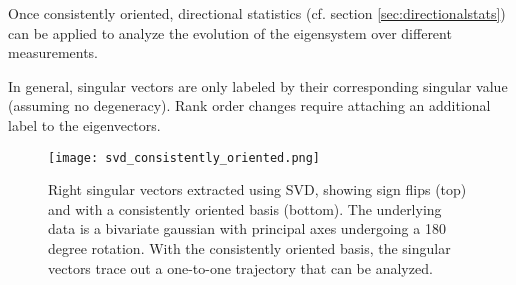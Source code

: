 Once consistently oriented, directional statistics (cf. section \ref{sec:directionalstats}) can be applied to analyze the evolution of the eigensystem over different measurements. 

In general, singular vectors are only labeled by their corresponding singular value (assuming no degeneracy). Rank order changes require attaching an additional label to the eigenvectors.

\begin{figure}
\centering
    \texttt{[image: svd\_consistently\_oriented.png]}
    \caption{Right singular vectors extracted using SVD, showing sign flips (top) and with a consistently oriented basis (bottom). The underlying data is a bivariate gaussian with principal axes undergoing a 180 degree rotation. With the consistently oriented basis, the singular vectors trace out a one-to-one trajectory that can be analyzed.}
    \label{fig:svd_consistently_oriented}
\end{figure}
